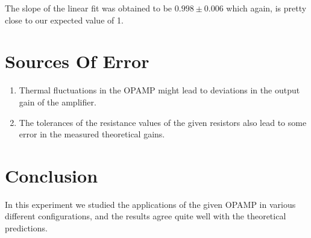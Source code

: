 \documentclass[10pt]{scrartcl}
\theoremstyle{definition}
\begin{document}
The slope of the linear fit was obtained to be $0.998 \pm 0.006$ which again, is pretty close to our expected
value of 1.
\section{Sources Of Error}
\begin{enumerate}
    \item Thermal fluctuations in the OPAMP might lead to deviations in the output gain of the 
        amplifier.
    \item The tolerances of the resistance values of the given resistors also lead to some error 
        in the measured theoretical gains.
    
\end{enumerate}
\section{Conclusion}
In this experiment we studied the applications of the given OPAMP in various different configurations, and the results agree quite well
with the theoretical predictions.
\clearpage
\end{document}
